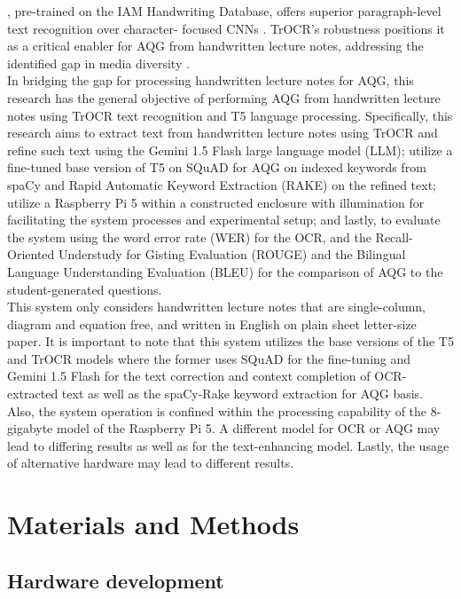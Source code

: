 \documentclass[conference]{IEEEtran}
\begin{document}
\cite{Li2021}, pre-trained on the IAM Handwriting Database, offers superior paragraph-level text recognition over character-
focused CNNs \cite{Mortadi2023}. TrOCR’s robustness positions it as a critical enabler for AQG from handwritten lecture notes, addressing the identified gap in media diversity \cite{Arbaaeen2020}. 
\\
\indent In bridging the gap for processing handwritten lecture notes for AQG, this research has the 
general objective of performing AQG from handwritten lecture
notes using TrOCR text recognition and T5 language processing.
Specifically, this research aims to extract text from
handwritten lecture notes using TrOCR and refine such text 
using the Gemini 1.5 Flash large language model (LLM); utilize 
a fine-tuned base version of T5 on SQuAD for AQG on 
indexed keywords from spaCy and Rapid Automatic Keyword 
Extraction (RAKE) on the refined text; utilize a Raspberry 
Pi 5 within a constructed enclosure with illumination 
for facilitating the system processes and experimental setup;
and lastly, to evaluate the system using the word error 
rate (WER) for the OCR, and the Recall-Oriented Understudy for 
Gisting Evaluation (ROUGE) and the Bilingual Language Understanding 
Evaluation (BLEU) for the comparison of AQG to the 
student-generated questions.
\\
\indent This system only considers handwritten lecture notes 
that are single-column, diagram and equation free, and written 
in English on plain sheet letter-size paper. It is important to note that 
this system utilizes the base versions of the T5 and TrOCR models where the 
former uses SQuAD for the fine-tuning and Gemini 1.5 Flash for the 
text correction and context completion of OCR-extracted text as well as 
the spaCy-Rake keyword extraction for AQG basis. Also, the system operation is confined 
within the processing capability of the 8-gigabyte model of the Raspberry Pi 5.
A different model for OCR or AQG may lead to differing results as well as 
for the text-enhancing model. Lastly, the usage of alternative hardware 
may lead to different results.
\section{Materials and Methods}
\subsection{Hardware development} 
\end{document}
